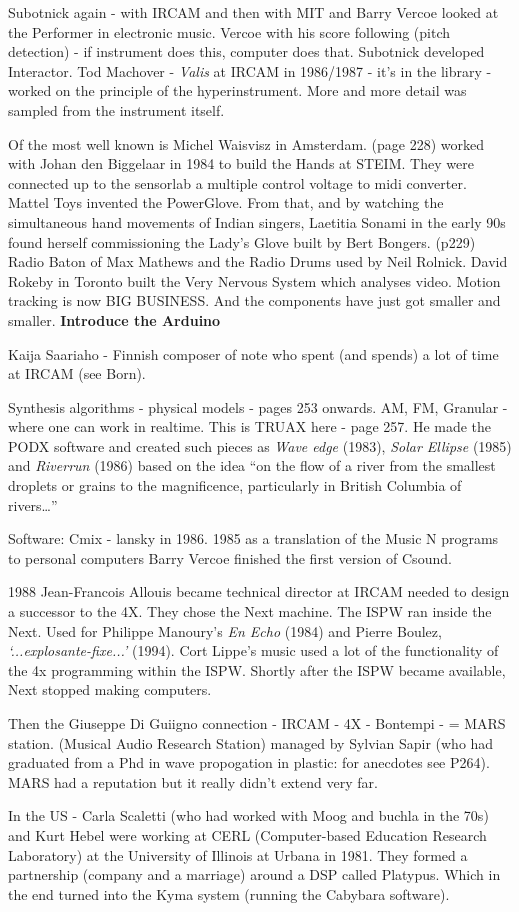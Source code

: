 Subotnick again - with IRCAM and then with MIT and Barry Vercoe looked at the Performer in electronic music.  Vercoe with his score following (pitch detection) - if instrument does this, computer does that.  Subotnick developed Interactor.  Tod Machover - \textit{Valis} at IRCAM in 1986/1987 - it's in the library - worked on the principle of the hyperinstrument.  More and more detail was sampled from the instrument itself.

Of the most well known is Michel Waisvisz in Amsterdam. (page 228) worked with Johan den Biggelaar in 1984 to build the Hands  at STEIM.  They were connected up to the sensorlab a multiple control voltage to midi converter. Mattel Toys invented the PowerGlove.  
From that, and by watching the simultaneous hand movements of Indian singers, Laetitia Sonami in the early 90s found herself commissioning the Lady's Glove built by Bert Bongers. (p229) Radio Baton of Max Mathews and the Radio Drums used by Neil Rolnick.
David Rokeby in Toronto built the Very Nervous System which analyses video.  Motion tracking is now BIG BUSINESS. And the components have just got smaller and smaller. \textbf{Introduce the Arduino}

Kaija Saariaho - Finnish composer of note who spent (and spends) a lot of time at IRCAM (see Born).

Synthesis algorithms - physical models - pages 253 onwards. AM, FM, Granular - where one can work in realtime.  This is TRUAX here - page 257.  He made the PODX software and created such pieces as \textit{Wave edge} (1983), \textit{Solar Ellipse} (1985) and \textit{Riverrun} (1986) based on the idea ``on the flow of a river from the smallest droplets or grains to the magnificence, particularly in British Columbia of rivers…''


Software: Cmix - lansky in 1986. 1985 as a translation of the Music N programs to personal computers Barry Vercoe finished the first version of Csound.

1988 Jean-Francois Allouis became technical director at IRCAM needed to design a successor to the 4X. They chose the Next machine. The ISPW ran inside the Next. Used for Philippe Manoury's \textit{En Echo} (1984) and Pierre Boulez, \textit{`...explosante-fixe...'} (1994). Cort Lippe's music used a lot of the functionality of the 4x programming within the ISPW.  Shortly after the ISPW became available, Next stopped making computers.

Then the Giuseppe Di Guiigno connection - IRCAM - 4X - Bontempi - = MARS station. (Musical Audio Research Station) managed by Sylvian Sapir (who had graduated from a Phd in wave propogation in plastic: for anecdotes see P264).  MARS had a reputation but it really didn't extend very far.

In the US - Carla Scaletti (who had worked with Moog and buchla in the 70s)  and Kurt Hebel were working at CERL (Computer-based Education Research Laboratory) at the University of Illinois at Urbana in 1981.  They formed a partnership (company and a marriage) around a DSP called Platypus. Which in the end  turned into the Kyma system (running the Cabybara software).


